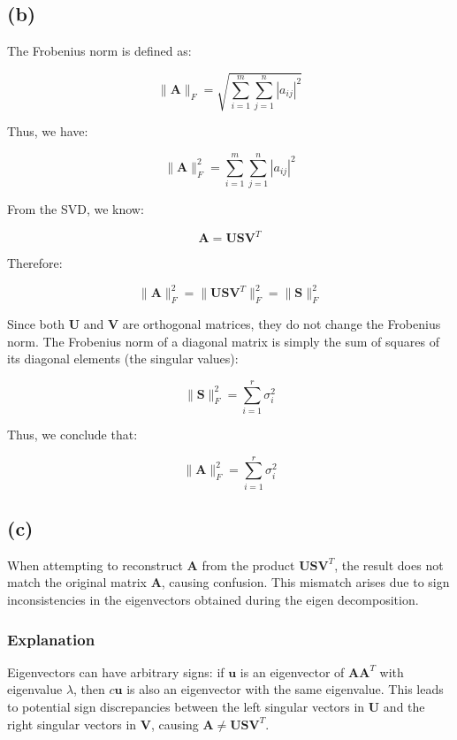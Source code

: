 \documentclass{article}
\begin{document}
\subsection*{(b)}

The Frobenius norm is defined as:

\[
\|\mathbf{A}\|_F = \sqrt{\sum_{i=1}^{m} \sum_{j=1}^{n} |a_{ij}|^2}
\]

Thus, we have:

\[
\|\mathbf{A}\|_F^2 = \sum_{i=1}^{m} \sum_{j=1}^{n} |a_{ij}|^2
\]

From the SVD, we know:

\[
\mathbf{A} = \mathbf{U} \mathbf{S} \mathbf{V}^T
\]

Therefore:

\[
\|\mathbf{A}\|_F^2 = \|\mathbf{U} \mathbf{S} \mathbf{V}^T\|_F^2 = \|\mathbf{S}\|_F^2
\]

Since both \(\mathbf{U}\) and \(\mathbf{V}\) are orthogonal matrices, they do not change the Frobenius norm. The Frobenius norm of a diagonal matrix is simply the sum of squares of its diagonal elements (the singular values):

\[
\|\mathbf{S}\|_F^2 = \sum_{i=1}^{r} \sigma_i^2
\]

Thus, we conclude that:

\[
\|\mathbf{A}\|_F^2 = \sum_{i=1}^{r} \sigma_i^2
\]

\subsection*{(c)}

When attempting to reconstruct \( \mathbf{A} \) from the product \( \mathbf{U} \mathbf{S} \mathbf{V}^T \), the result does not match the original matrix \( \mathbf{A} \), causing confusion. This mismatch arises due to sign inconsistencies in the eigenvectors obtained during the eigen decomposition. 

\subsubsection*{Explanation}

Eigenvectors can have arbitrary signs: if \( \mathbf{u} \) is an eigenvector of \( \mathbf{A} \mathbf{A}^T \) with eigenvalue \( \lambda \), then \( c \mathbf{u} \) is also an eigenvector with the same eigenvalue. This leads to potential sign discrepancies between the left singular vectors in \( \mathbf{U} \) and the right singular vectors in \( \mathbf{V} \), causing \( \mathbf{A} \neq \mathbf{U} \mathbf{S} \mathbf{V}^T \).
\end{document}
